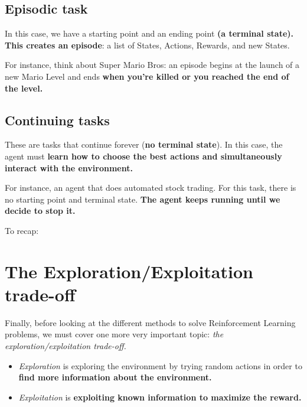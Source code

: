 \documentclass[11pt,a4paper]{article}
\begin{document}
\subsection{Episodic task}\label{episodic-task}

In this case, we have a starting point and an ending point \textbf{(a terminal state). This creates an episode}: a list of States, Actions, Rewards, and new States.

For instance, think about Super Mario Bros: an episode begins at the launch of a new Mario Level and ends \textbf{when you're killed or you reached the end of the level.}


\subsection{Continuing tasks}\label{continuing-tasks}

These are tasks that continue forever (\textbf{no terminal state}). In this case, the agent must \textbf{learn how to choose the best actions and simultaneously interact with the environment.}

For instance, an agent that does automated stock trading. For this task, there is no starting point and terminal state. \textbf{The agent keeps running until we decide to stop it.}


To recap:


\section{The Exploration/Exploitation trade-off}\label{the-explorationexploitation-trade-off}

Finally, before looking at the different methods to solve Reinforcement Learning problems, we must cover one more very important topic: \emph{the exploration/exploitation trade-off.}

\begin{itemize}
\tightlist
\item
  \emph{Exploration} is exploring the environment by trying random actions in order to \textbf{find more information about the environment.}
\item
  \emph{Exploitation} is \textbf{exploiting known information to maximize the reward.}
\end{itemize}
\end{document}
